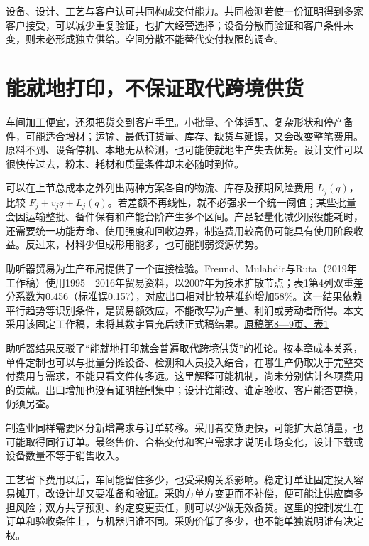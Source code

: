 \documentclass[UTF8,fontset=windows,12pt,a4paper,oneside,openany]{ctexbook}
\begin{document}
设备、设计、工艺与客户认可共同构成交付能力。共同检测若使一份证明得到多家客户接受，可以减少重复验证，也扩大经营选择；设备分散而验证和客户条件未变，则未必形成独立供给。空间分散不能替代交付权限的调查。

\section{能就地打印，不保证取代跨境供货}

车间加工便宜，还须把货交到客户手里。小批量、个体适配、复杂形状和停产备件，可能适合增材；运输、最低订货量、库存、缺货与延误，又会改变整笔费用。原料不到、设备停机、本地无从检测，也可能使就地生产失去优势。设计文件可以很快传过去，粉末、耗材和质量条件却未必随时到位。

可以在上节总成本之外列出两种方案各自的物流、库存及预期风险费用 $L_j(q)$，比较 $F_j+v_jq+L_j(q)$。若差额不再线性，就不必强求一个统一阈值；某些批量会因运输整批、备件保有和产能台阶产生多个区间。产品轻量化减少服役能耗时，还需要统一功能寿命、使用强度和回收边界，制造费用较高仍可能具有使用阶段收益。反过来，材料少但成形用能多，也可能削弱资源优势。

助听器贸易为生产布局提供了一个直接检验。Freund、Mulabdic与Ruta（2019年工作稿）使用1995—2016年贸易资料，以2007年为技术扩散节点；表1第4列双重差分系数为0.456（标准误0.157），对应出口相对比较基准约增加58\%。这一结果依赖平行趋势等识别条件，是贸易额效应，不能改写为产量、利润或劳动者所得。本文采用该固定工作稿，未将其数字冒充后续正式稿结果。\href{https://documents1.worldbank.org/curated/en/152701569432061451/pdf/Is-3D-Printing-a-Threat-to-Global-Trade-The-Trade-Effects-You-Didnt-Hear-About.pdf}{原稿第8—9页、表1}

助听器结果反驳了“能就地打印就会普遍取代跨境供货”的推论。按本章成本关系，单件定制也可以与批量分摊设备、检测和人员投入结合，在哪生产仍取决于完整交付费用与需求，不能只看文件传多远。这里解释可能机制，尚未分别估计各项费用的贡献。出口增加也没有证明控制集中；设计谁能改、谁定验收、客户能否更换，仍须另查。

制造业同样需要区分新增需求与订单转移。采用者交货更快，可能扩大总销量，也可能取得同行订单。最终售价、合格交付和客户需求才说明市场变化，设计下载或设备数量不等于销售收入。

工艺省下费用以后，车间能留住多少，也受采购关系影响。稳定订单让固定投入容易摊开，改设计却又要准备和验证。采购方单方变更而不补偿，便可能让供应商多担风险；双方共享预测、约定变更责任，则可以少做无效备货。这里的控制发生在订单和验收条件上，与机器归谁不同。采购价低了多少，也不能单独说明谁有决定权。
\end{document}
